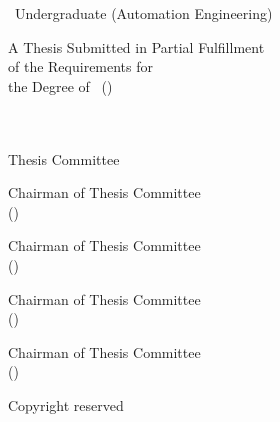    \newpage
    \thispagestyle{empty}
    \begin{center}
    \fontsize{13}{15}\selectfont
    
    \thesistitle
    
    \vspace{2cm}
    
    \authorname\ Undergraduate (Automation Engineering)
    
    \vspace{2cm}
    
    A Thesis Submitted in Partial Fulfillment\\
    of the Requirements for\\
    the Degree of \degree\ (\fieldofstudy)\\
    \faculty\\
    \university\\
    \academicyear
    
    \vspace{2cm}
    
    Thesis Committee
    
    \vspace{2cm}
    
    \makebox[10cm]{\dotfill} Chairman of Thesis Committee\\
    (\committeechair)
    
    \vspace{0.2cm}
    
    \makebox[10cm]{\dotfill} Chairman of Thesis Committee\\
    (\committeemember)
    
    \vspace{0.2cm}
    
    \makebox[10cm]{\dotfill} Chairman of Thesis Committee\\
    (\committeemember)
    
    \vspace{0.2cm}
    
    \makebox[10cm]{\dotfill} Chairman of Thesis Committee\\
    (\committeemember)
    
    \vspace{1cm}
    
    Copyright reserved
    
    \end{center}
